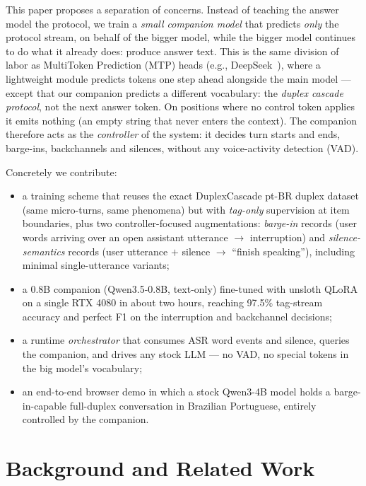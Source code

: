 \documentclass[conference]{IEEEtran}
\begin{document}
This paper proposes a separation of concerns. Instead of teaching the answer
model the protocol, we train a \emph{small companion model} that predicts
\emph{only} the protocol stream, on behalf of the bigger model, while the
bigger model continues to do what it already does: produce answer text.
This is the same division of labor as MultiToken Prediction (MTP) heads
(e.g., DeepSeek~\cite{deepseek}), where a lightweight module predicts tokens
one step ahead alongside the main model — except that our companion predicts
a different vocabulary: the \emph{duplex cascade protocol}, not the next
answer token. On positions where no control token applies it emits nothing
(an empty string that never enters the context). The companion therefore acts
as the \emph{controller} of the system: it decides turn starts and ends,
barge-ins, backchannels and silences, without any voice-activity detection
(VAD).

Concretely we contribute:

\begin{itemize}
\item a training scheme that reuses the exact DuplexCascade pt-BR duplex
dataset (same micro-turns, same phenomena) but with \emph{tag-only}
supervision at item boundaries, plus two controller-focused augmentations:
\emph{barge-in} records (user words arriving over an open assistant
utterance $\rightarrow$ interruption) and \emph{silence-semantics} records
(user utterance $+$ silence $\rightarrow$ ``finish speaking''), including
minimal single-utterance variants;
\item a 0.8B companion (Qwen3.5-0.8B, text-only) fine-tuned with unsloth
QLoRA on a single RTX 4080 in about two hours, reaching 97.5\% tag-stream
accuracy and perfect F1 on the interruption and backchannel decisions;
\item a runtime \emph{orchestrator} that consumes ASR word events and
silence, queries the companion, and drives any stock LLM — no VAD, no
special tokens in the big model's vocabulary;
\item an end-to-end browser demo in which a stock Qwen3-4B model holds a
barge-in-capable full-duplex conversation in Brazilian Portuguese, entirely
controlled by the companion.
\end{itemize}

\section{Background and Related Work}
\end{document}
